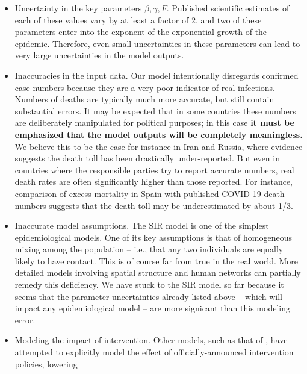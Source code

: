 \documentclass[english,12pt,letter]{article}
\newcommand{\ifr}{F}
\begin{document}
\begin{itemize}
    \item Uncertainty in the key parameters $\beta, \gamma, \ifr$.
            Published scientific estimates of each of these values vary by
            at least a factor of 2, and two of these parameters enter
            into the exponent of the exponential growth of the epidemic.
            Therefore, even small uncertainties in these parameters can lead to 
            very large uncertainties in the model outputs.
    \item Inaccuracies in the input data.  Our model intentionally disregards
            confirmed case numbers because they are a very poor indicator of
            real infections.  Numbers of deaths are typically much more accurate,
            but still contain substantial errors.  It may be expected that in
            some countries these numbers are deliberately manipulated for
            political purposes; in this case {\bf it must be emphasized that
            the model outputs will be completely meaningless.}  We believe this
            to be the case for instance in Iran and Russia, where evidence suggests
            the death toll has been drastically under-reported.  But even
            in countries where the responsible parties try to report accurate
            numbers, real death rates are often significantly higher than those
            reported.  For instance, comparison of excess mortality in Spain
            with published COVID-19 death numbers suggests that the death toll
            may be underestimated by about 1/3.
    \item Inaccurate model assumptions.  The SIR model is one of the simplest
            epidemiological models.  One of its key assumptions is that
            of homogeneous mixing among the population -- i.e., that any two
            individuals are equally likely to have contact.  This is of course
            far from true in the real world.  More detailed models involving
            spatial structure and human networks can partially remedy this
            deficiency.  We have stuck to the SIR model so far because it seems
            that the parameter uncertainties already listed above -- which will
            impact any epidemiological model -- are more signicant than this
            modeling error.
    \item Modeling the impact of intervention.  Other models, such as that of
            \cite{flaxman2020report}, have attempted to explicitly model the
            effect of officially-announced intervention policies, lowering

\end{itemize}
\end{document}
